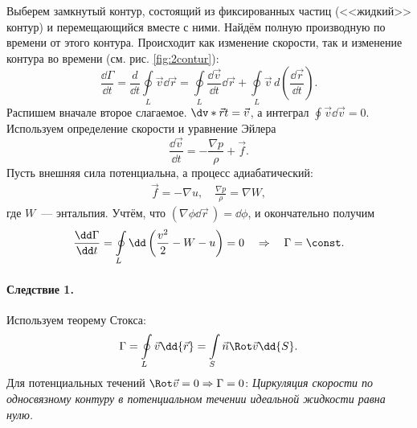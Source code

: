 Выберем замкнутый контур, состоящий из фиксированных частиц (<<жидкий>> контур) и перемещающийся вместе с ними.  Найдём полную производную по времени от этого контура. Происходит как изменение скорости, так и изменение контура во времени (см. рис. \ref{fig:2contur}):
\begin{equation}
\frac{\dd \Gamma}{\dd t}=\frac{d}{\dd t} \oint\limits_{L} \vec{v} \dd \vec{r}=\oint\limits_{L} \frac{\dd \vec{v}}{\dd t} \dd \vec{r}+\oint\limits_L \vec{v}\, d\left(\frac{\dd \vec{r}}{\dd t}\right).
\end{equation}
Распишем вначале второе слагаемое. $\dv*{\vec{r}}{t}=\vec{v}$, а интеграл $\oint \vec{v}\dd{\vec{v}}=0$.
%
Используем определение скорости и уравнение Эйлера
\begin{equation}
\frac { \dd \vec{v}  } { \dd t } = - \frac { \nabla p } { \rho } + \vec { f }.
\end{equation}
%
Пусть внешняя сила потенциальна, а процесс адиабатический:
\begin{equation}\begin{aligned}
{ \vec { f } = - \nabla u }, \quad
{ \frac { \nabla p } { \rho } = \nabla W },
\end{aligned}\end{equation}
где $W$~--- энтальпия.  Учтём, что $ ( \nabla \phi \dd{\vec{r}}\, ) = \dd \phi $, и окончательно получим
\begin{equation}
\frac { \dd \Gamma } { \dd t } = \oint\limits _ { L } \dd \left( \frac { v^2 } { 2 } - W - u \right) = 0 \quad \Rightarrow \quad  \Gamma = \const.
\end{equation}

\paragraph{Следствие 1.} Используем теорему Стокса:
\begin{equation}
\Gamma = \oint \limits_ { L } \vec{v} \dd{\vec{r}} = \int \limits_ { S } \vec { n }\Rot\vec{v}\dd{S}.
\end{equation}
Для потенциальных течений $ \Rot \vec{v} = 0 \Rightarrow \Gamma = 0$: \textit{Циркуляция скорости по {односвязному контуру} в потенциальном течении идеальной жидкости равна нулю.}

